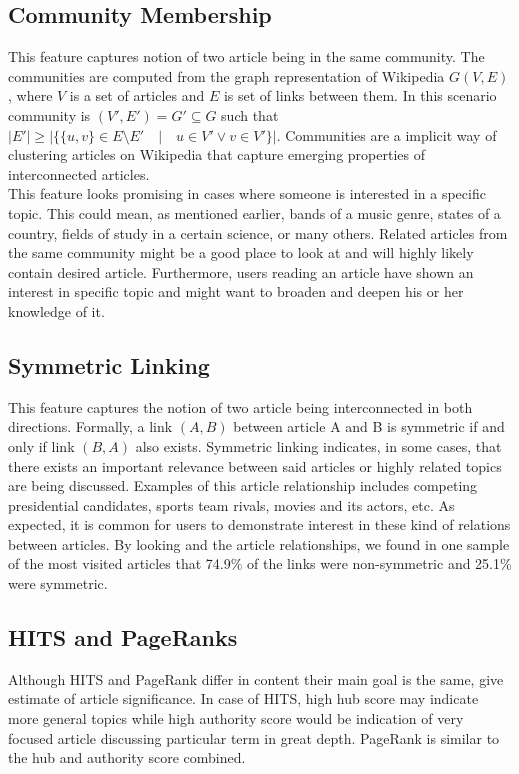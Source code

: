 \subsection{Community Membership}
This feature captures notion of two article being in the same community. The communities are computed from the graph representation of Wikipedia $G(V,E)$, where $V$ is a set of articles and $E$ is set of links between them. In this scenario community is $(V', E') = G' \subseteq G$ such that $|E'| \ge |\{ \{u,v\} \in E\setminus E'  \quad | \quad u \in V' \vee v \in V' \}|$. Communities are a implicit way of clustering articles on Wikipedia that capture emerging properties of interconnected articles.  \\

This feature looks promising in cases where someone is interested in a specific topic. This could mean, as mentioned earlier, bands of a music genre, states of a country, fields of study in a certain science, or many others. Related articles from the same community might be a good place to look at and will highly likely contain desired article. Furthermore, users reading an article have shown an interest in specific topic and might want to broaden and deepen his or her knowledge of it.

\subsection{Symmetric Linking}
This feature captures the notion of two article being interconnected in both directions. Formally, a link $(A,B)$ between article A and B is symmetric if and only if link $(B,A)$ also exists. Symmetric linking indicates, in some cases, that there exists an important relevance between said articles or highly related topics are being discussed. Examples of this article relationship includes competing presidential candidates, sports team rivals, movies and its actors, etc. As expected, it is common for users to demonstrate interest in these kind of relations between articles. By looking and the article relationships, we found in one sample of the most visited articles that 74.9\% of the links were non-symmetric and 25.1\% were symmetric.

\subsection{HITS and PageRanks}

Although HITS and PageRank differ in content their main goal is the same, give estimate of article significance. In case of HITS, high hub score may indicate more general topics while high authority score would be indication of very focused article discussing particular term in great depth. PageRank is similar to the hub and authority score combined. \\

